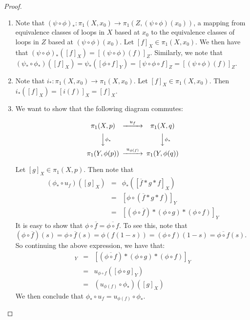 \begin{proof}
	\begin{enumerate}
		\item Note that $(\psi \circ \phi)_\ast : \pi_1(X,x_0 ) \to \pi_1(Z,(\psi \circ \phi)(x_0) )$, a mapping from equivalence classes of loops in $X$ based at $x_0$ to the equivalence classes of loops in $Z$ based at $(\psi\circ \phi)(x_0)$. Let $[f]_X \in \pi_1(X,x_0)$. We then have that $(\psi \circ \phi)_\ast ([f]_X) = [(\psi \circ \phi)(f)]_Z$. Similarly, we note that $(\psi_\ast \circ \phi_\ast ) ([f]_X) = \psi_\ast ([\phi\circ f]_Y) = [\psi \circ \phi \circ f ]_Z = [(\psi \circ \phi)(f) ]_Z$. 
		\item Note that $i_\ast : \pi_1 (X,x_0) \to \pi_1 (X,x_0)$. Let $[f]_X \in \pi_1(X,x_0)$. Then $i_\ast ([f]_X) = [i(f)]_X = [f]_X$. 
		\item We want to show that the following diagram commutes:
		
		$$ 
		\begin{CD}
			\pi_1(X,p) @>u_f>> \pi_1(X,q)\\
			@VV{\phi_\ast} V @VV{\phi_{\ast}}V\\
			\pi_1(Y,\phi(p)) @>u_{\phi(f)}>> \pi_1 (Y,\phi(q)) 
		\end{CD}
		$$
		
		Let $[g]_X\in \pi_1(X,p)$. Then note that 
		\begin{eqnarray*}
			(\phi_\ast \circ u_f)([g]_X) &=& \phi_\ast ([\overline{f}\ast g \ast f]_X) \\
			&= &[ \phi \circ(\overline{f} \ast g \ast f) ]_Y\\
			&=& [(\phi\circ \overline{f}) \ast (\phi \circ g) \ast (\phi\circ f) ] _Y 
		\end{eqnarray*}
		It is easy to show that $\phi \circ \overline{f} = \overline{\phi \circ f}$. To see this, note that $(\phi \circ \overline{f})(s) = \phi \circ \overline{f}(s) = \phi (f(1-s)) = (\phi \circ f) (1-s) = \overline{\phi \circ f}(s)$. So continuing the above expression, we have that: 
		\begin{eqnarray*}
			[(\phi\circ \overline{f}) \ast (\phi \circ g) \ast (\phi\circ f) ] _Y&=& [ (\overline{\phi \circ f}) \ast (\phi \circ g) \ast (\phi \circ f) ] _Y \\
			&=& u_{\phi\circ f} ([\phi \circ g]_Y)\\
			& =& (u_{\phi(f)} \circ \phi_\ast )([g]_X) 
		\end{eqnarray*}
		We then conclude that $\phi_\ast \circ u_f = u_{\phi(f)} \circ \phi_\ast$. 
	\end{enumerate}
\end{proof}
